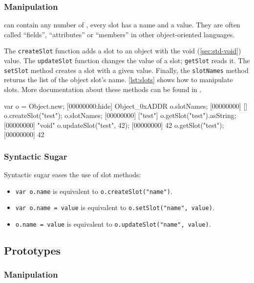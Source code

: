 \subsubsection{Manipulation}

 can contain any number of , every slot has a
name and a value. They are often called ``fields'', ``attributes'' or
``members'' in other object-oriented languages.

The \lstinline|createSlot| function adds a slot to an object with the
void (\autoref{sec:std-void}) value. The \lstinline|updateSlot|
function changes the value of a slot; \lstinline|getSlot| reads
it. The \lstinline|setSlot| method creates a slot with a given
value. Finally, the \lstinline|slotNames| method returns the list of
the object slot's name. \autoref{lst:slots} shows how to manipulate
slots. More documentation about these methods can be found in
.

\begin{urbiscript}[caption=Manipulating slots, label=lst:slots,
  float=\floatpos]
var o = Object.new;
[00000000:hide] Object_0xADDR
o.slotNames;
[00000000] []
o.createSlot("test");
o.slotNames;
[00000000] ["test"]
o.getSlot("test").asString;
[00000000] "void"
o.updateSlot("test", 42);
[00000000] 42
o.getSlot("test");
[00000000] 42
\end{urbiscript}

\subsubsection{Syntactic Sugar}

Syntactic sugar eases the use of slot methods:

\begin{itemize}
\item \lstinline|var o.name| is equivalent to
  \lstinline|o.createSlot("name")|.
\item \lstinline|var o.name = value| is equivalent to
  \lstinline|o.setSlot("name", value)|.
\item \lstinline|o.name = value| is equivalent to
  \lstinline|o.updateSlot("name", value)|.
\end{itemize}


\subsection{Prototypes}

\subsubsection{Manipulation}

